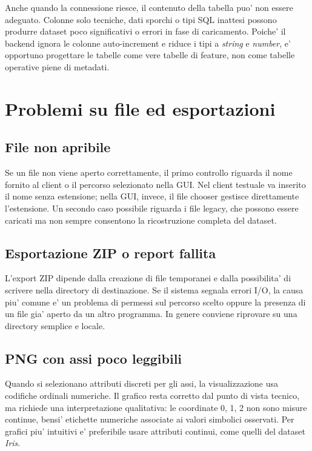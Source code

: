Anche quando la connessione riesce, il contenuto della tabella puo' non essere adeguato.
Colonne solo tecniche, dati sporchi o tipi SQL inattesi possono produrre dataset poco
significativi o errori in fase di caricamento. Poiche' il backend ignora le colonne
auto-increment e riduce i tipi a \emph{string} e \emph{number}, e' opportuno progettare
le tabelle come vere tabelle di feature, non come tabelle operative piene di metadati.

\section{Problemi su file ed esportazioni}

\subsection{File  non apribile}

Se un file  non viene aperto correttamente, il primo controllo riguarda il
nome fornito al client o il percorso selezionato nella GUI. Nel client testuale va
inserito il nome senza estensione; nella GUI, invece, il file chooser gestisce
direttamente l'estensione. Un secondo caso possibile riguarda i file legacy, che possono
essere caricati ma non sempre consentono la ricostruzione completa del dataset.

\subsection{Esportazione ZIP o report fallita}

L'export ZIP dipende dalla creazione di file temporanei e dalla possibilita' di scrivere
nella directory di destinazione. Se il sistema segnala errori I/O, la causa piu' comune
e' un problema di permessi sul percorso scelto oppure la presenza di un file gia' aperto
da un altro programma. In genere conviene riprovare su una directory semplice e locale.

\subsection{PNG con assi poco leggibili}

Quando si selezionano attributi discreti per gli assi, la visualizzazione usa codifiche
ordinali numeriche. Il grafico resta corretto dal punto di vista tecnico, ma richiede una
interpretazione qualitativa: le coordinate 0, 1, 2 non sono misure continue, bensi'
etichette numeriche associate ai valori simbolici osservati. Per grafici piu' intuitivi
e' preferibile usare attributi continui, come quelli del dataset \emph{Iris}.

